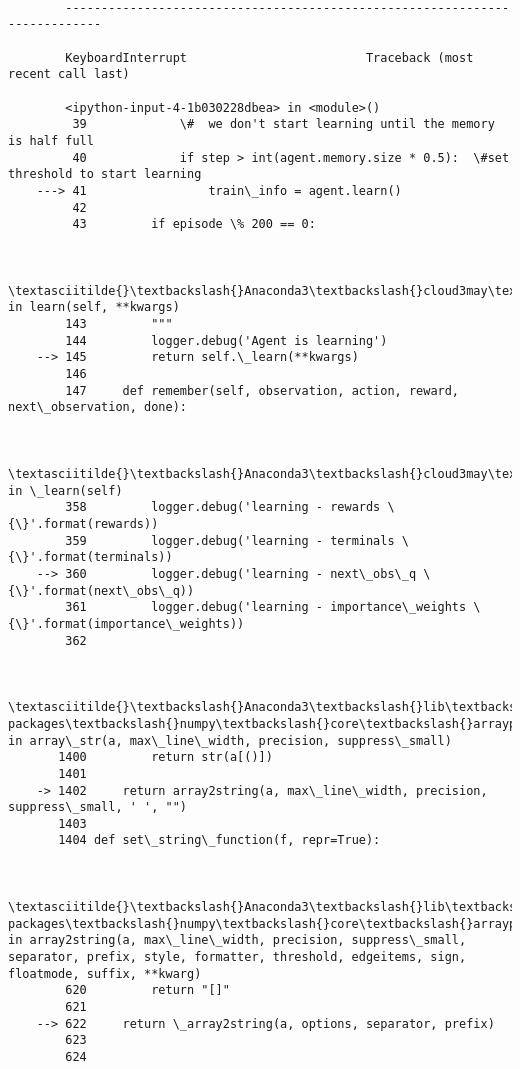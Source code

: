 \documentclass[11pt]{article}
\begin{document}
    \begin{Verbatim}[commandchars=\\\{\}]

        ---------------------------------------------------------------------------

        KeyboardInterrupt                         Traceback (most recent call last)

        <ipython-input-4-1b030228dbea> in <module>()
         39             \#  we don't start learning until the memory is half full
         40             if step > int(agent.memory.size * 0.5):  \#set threshold to start learning
    ---> 41                 train\_info = agent.learn()
         42 
         43         if episode \% 200 == 0:
    

        \textasciitilde{}\textbackslash{}Anaconda3\textbackslash{}cloud3may\textbackslash{}energy\_py\textbackslash{}agents\textbackslash{}agent.py in learn(self, **kwargs)
        143         """
        144         logger.debug('Agent is learning')
    --> 145         return self.\_learn(**kwargs)
        146 
        147     def remember(self, observation, action, reward, next\_observation, done):
    

        \textasciitilde{}\textbackslash{}Anaconda3\textbackslash{}cloud3may\textbackslash{}energy\_py\textbackslash{}agents\textbackslash{}dqn.py in \_learn(self)
        358         logger.debug('learning - rewards \{\}'.format(rewards))
        359         logger.debug('learning - terminals \{\}'.format(terminals))
    --> 360         logger.debug('learning - next\_obs\_q \{\}'.format(next\_obs\_q))
        361         logger.debug('learning - importance\_weights \{\}'.format(importance\_weights))
        362 
    

        \textasciitilde{}\textbackslash{}Anaconda3\textbackslash{}lib\textbackslash{}site-packages\textbackslash{}numpy\textbackslash{}core\textbackslash{}arrayprint.py in array\_str(a, max\_line\_width, precision, suppress\_small)
       1400         return str(a[()])
       1401 
    -> 1402     return array2string(a, max\_line\_width, precision, suppress\_small, ' ', "")
       1403 
       1404 def set\_string\_function(f, repr=True):
    

        \textasciitilde{}\textbackslash{}Anaconda3\textbackslash{}lib\textbackslash{}site-packages\textbackslash{}numpy\textbackslash{}core\textbackslash{}arrayprint.py in array2string(a, max\_line\_width, precision, suppress\_small, separator, prefix, style, formatter, threshold, edgeitems, sign, floatmode, suffix, **kwarg)
        620         return "[]"
        621 
    --> 622     return \_array2string(a, options, separator, prefix)
        623 
        624 
    


\end{Verbatim}
\end{document}
